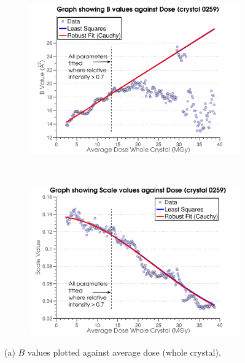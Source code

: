 \begin{figure}
        \centering
        \begin{subfigure}[b]{0.825\textwidth}
                \centering
                \includegraphics[width=\textwidth]{figures/dwd/bplot.pdf}
                \caption{}
                \label{figbvalues}
        \end{subfigure}
				\\
        \begin{subfigure}[b]{0.825\textwidth}
                \centering
                \includegraphics[width=\textwidth]{figures/dwd/scaleplot.pdf}
                \caption{}
                \label{figscalevalues}
        \end{subfigure}
        \caption[Scale and B factor values plotted against the average dose over the whole crystal.]{(a) $B$ values plotted against average dose (whole crystal).
}
\end{figure}
